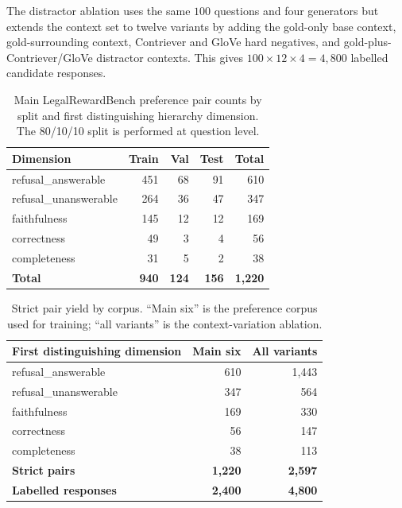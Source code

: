 \documentclass{article}
\theoremstyle{plain}
\theoremstyle{definition}
\theoremstyle{remark}
\begin{document}
The distractor ablation uses the same $100$ questions and four generators but extends the context set to twelve variants by adding the gold-only base context, gold-surrounding context, Contriever and GloVe hard negatives, and gold-plus-Contriever/GloVe distractor contexts.  This gives $100 \times 12 \times 4 = 4{,}800$ labelled candidate responses.

\begin{table}[h]
\centering
\caption{Main LegalRewardBench preference pair counts by split and first distinguishing hierarchy dimension. The 80/10/10 split is performed at question level.}
\label{app:tab:lrb-splits}
\small
\setlength{\tabcolsep}{4pt}
\begin{tabular}{lrrrr}
\toprule
\textbf{Dimension} & \textbf{Train} & \textbf{Val} & \textbf{Test} & \textbf{Total} \\
\midrule
refusal\_answerable   & 451 & 68 & 91  & 610 \\
refusal\_unanswerable & 264 & 36 & 47  & 347 \\
faithfulness          & 145 & 12 & 12  & 169 \\
correctness           & 49  &  3 & 4   &  56 \\
completeness          & 31  &  5 & 2   &  38 \\
\midrule
\textbf{Total}        & \textbf{940} & \textbf{124} & \textbf{156} & \textbf{1{,}220} \\
\bottomrule
\end{tabular}
\end{table}

\begin{table}[h]
\centering
\caption{Strict pair yield by corpus. ``Main six'' is the preference corpus used for training; ``all variants'' is the context-variation ablation.}
\label{app:tab:pair-yield}
\small
\setlength{\tabcolsep}{4pt}
\begin{tabular}{lrr}
\toprule
\textbf{First distinguishing dimension} & \textbf{Main six} & \textbf{All variants} \\
\midrule
refusal\_answerable   & 610 & 1{,}443 \\
refusal\_unanswerable & 347 & 564 \\
faithfulness          & 169 & 330 \\
correctness           & 56  & 147 \\
completeness          & 38  & 113 \\
\midrule
\textbf{Strict pairs} & \textbf{1{,}220} & \textbf{2{,}597} \\
\textbf{Labelled responses} & \textbf{2{,}400} & \textbf{4{,}800} \\
\bottomrule
\end{tabular}
\end{table}
\end{document}
